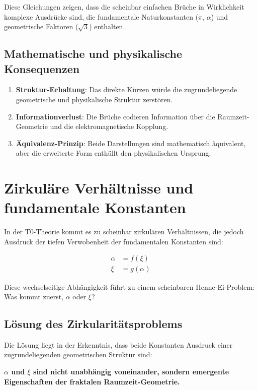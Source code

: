 \documentclass[12pt,a4paper]{article}
\begin{document}
	Diese Gleichungen zeigen, dass die scheinbar einfachen Brüche in Wirklichkeit komplexe Ausdrücke sind, die fundamentale Naturkonstanten ($\pi$, $\alpha$) und geometrische Faktoren ($\sqrt{3}$) enthalten.
	
	\subsection*{Mathematische und physikalische Konsequenzen}
	
	\begin{enumerate}
		\item \textbf{Struktur-Erhaltung}: Das direkte Kürzen würde die zugrundeliegende geometrische und physikalische Struktur zerstören.
		
		\item \textbf{Informationverlust}: Die Brüche codieren Information über die Raumzeit-Geometrie und die elektromagnetische Kopplung.
		
		\item \textbf{Äquivalenz-Prinzip}: Beide Darstellungen sind mathematisch äquivalent, aber die erweiterte Form enthüllt den physikalischen Ursprung.
	\end{enumerate}
	
	\section{Zirkuläre Verhältnisse und fundamentale Konstanten}
\label{sec:zirkulaer}

In der T0-Theorie kommt es zu scheinbar zirkulären Verhältnissen, die jedoch Ausdruck der tiefen Verwobenheit der fundamentalen Konstanten sind:

\begin{align*}
	\alpha &= f(\xi) \\
	\xi &= g(\alpha)
\end{align*}

Diese wechselseitige Abhängigkeit führt zu einem scheinbaren Henne-Ei-Problem: Was kommt zuerst, $\alpha$ oder $\xi$?

\subsection{Lösung des Zirkularitätsproblems}

Die Lösung liegt in der Erkenntnis, dass beide Konstanten Ausdruck einer zugrundeliegenden geometrischen Struktur sind:

\begin{tcolorbox}[colback=green!5!white,colframe=green!75!black]
	\textbf{$\alpha$ und $\xi$ sind nicht unabhängig voneinander, sondern emergente Eigenschaften der fraktalen Raumzeit-Geometrie.}
\end{tcolorbox}
\end{document}
